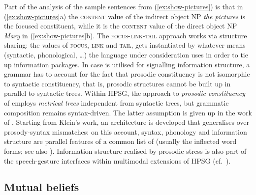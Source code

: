 \documentclass[output=paper]{langsci/langscibook}
\begin{document}
{Part of the analysis of the sample sentences from (\ref{ex:show-pictures}) is that in (\ref{ex:show-pictures}a) the \textsc{content} value of the indirect object NP \textit{the pictures} is the focused constituent, while it is the \textsc{content} value of the direct object NP \textit{Mary} in (\ref{ex:show-pictures}b).
%
The \textsc{focus-link-tail} approach works via structure sharing: the values of \textsc{focus}, \textsc{link} and \textsc{tail}, gets instantiated by whatever means (syntactic, phonological, \ldots) the language under consideration uses in order to tie up information packages.
 
%
In case  is utilised for signalling information structure, a grammar has to account for the fact that prosodic constituency is not isomorphic to syntactic constituency, that is, prosodic structures cannot be built up in parallel to syntactic trees. 
%
Within HPSG, the approach to \emph{prosodic constituency}  of \citet{Klein:2000} employs \emph{metrical trees}  independent from syntactic trees, but grammatic composition remains syntax-driven.
%
The latter assumption is given up in the work of \citet{Haji-Abdolhosseini2003a}. %
%
Starting from Klein's work, an architecture is developed that generalises over prosody-syntax mismatches: on this account, syntax, phonology and information structure are parallel features of a common list of  (usually the inflected word forms; see also ).
%
Information structure realised by prosodic stress is also part of the speech-gesture interfaces within multimodal extensions of HPSG (cf.\ ).
  



\subsection{Mutual beliefs}
\label{sec:mutual-beliefs}

}
\end{document}
